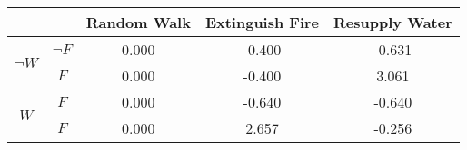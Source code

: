 \begin{center}
\begin{tabular}{|c|c|c|c|c|}
  \hline
  &   & Random Walk & Extinguish Fire & Resupply Water\\
  \hline
  \multirow{2}{*}{$\neg W$} & $\neg F$ & 0.000 & -0.400 & -0.631\\
  \cline{2-5}
   & $F$ & 0.000 & -0.400 & 3.061\\
  \hline
  \multirow{2}{*}{$W$} & $F$ & 0.000 & -0.640 & -0.640\\
  \cline{2-5}
   & $F$ & 0.000 & 2.657 & -0.256\\
  \hline
\end{tabular}
\end{center}

